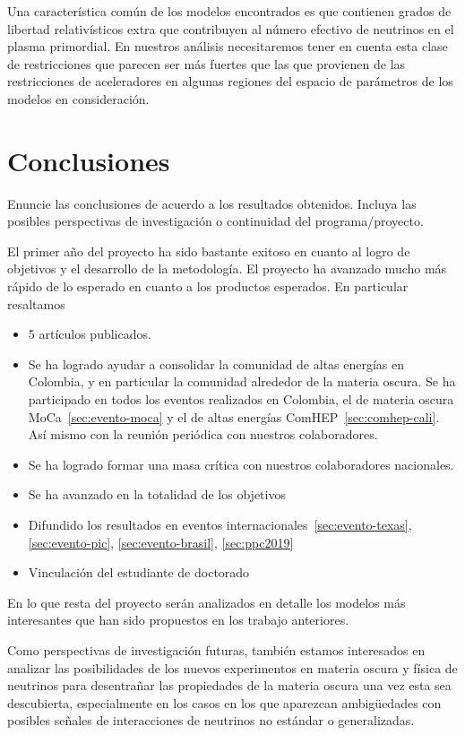 Una característica común de los modelos encontrados es que contienen
grados de libertad relativísticos extra que contribuyen al número
efectivo de neutrinos en el plasma primordial. En nuestros análisis
necesitaremos tener en cuenta esta clase de restricciones que parecen
ser más fuertes que las que provienen de las restricciones de
aceleradores en algunas regiones del espacio de parámetros de los
modelos en consideración.







\section{Conclusiones          }
\begin{instrucciones}
  Enuncie las conclusiones de acuerdo a los resultados obtenidos. Incluya las posibles perspectivas de investigación o continuidad del programa/proyecto.
\end{instrucciones}
El primer año del proyecto ha sido bastante exitoso en cuanto al logro
de objetivos y el desarrollo de la metodología. El proyecto ha
avanzado mucho más rápido de lo esperado en cuanto a los productos
esperados. En particular resaltamos
\begin{itemize}
\item 5 artículos publicados.
\item Se ha logrado ayudar a consolidar la comunidad de altas energías en Colombia, y en particular la comunidad alrededor de la materia oscura. Se ha participado en todos los eventos realizados en Colombia, el de materia oscura MoCa~\ref{sec:evento-moca} y el de altas energías ComHEP~\ref{sec:comhep-cali}. Así mismo con la reunión periódica con nuestros colaboradores.
\item Se ha logrado formar una masa crítica con nuestros colaboradores nacionales.
\item Se ha avanzado en la totalidad de los objetivos
\item Difundido los resultados en eventos internacionales~\ref{sec:evento-texas}, \ref{sec:evento-pic}, \ref{sec:evento-brasil}, \ref{sec:ppc2019}
\item Vinculación del estudiante de doctorado 
\end{itemize}
En lo que resta del proyecto serán analizados en detalle los modelos
más interesantes que han sido propuestos en los trabajo anteriores.

Como perspectivas de investigación futuras, también estamos
interesados en analizar las posibilidades  de los nuevos experimentos
en materia oscura y física de neutrinos para desentrañar las
propiedades de la materia oscura una vez esta sea descubierta,
especialmente en los casos en los que aparezcan ambigüedades con
posibles señales de interacciones de neutrinos no estándar o
generalizadas. 



